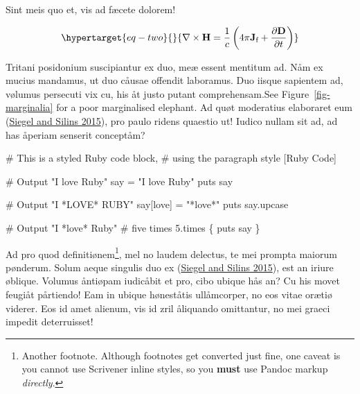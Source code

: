\documentclass[
  12pt,
  a4paper,
  oneside]{scrbook}
\newenvironment{Shaded}{\begin{snugshade}}{\end{snugshade}}
\newcommand{\AttributeTok}[1]{\textcolor[rgb]{0.40,0.45,0.13}{#1}}
\newcommand{\CommentTok}[1]{\textcolor[rgb]{0.37,0.37,0.37}{#1}}
\newcommand{\DecValTok}[1]{\textcolor[rgb]{0.68,0.00,0.00}{#1}}
\newcommand{\FunctionTok}[1]{\textcolor[rgb]{0.28,0.35,0.67}{#1}}
\newcommand{\KeywordTok}[1]{\textcolor[rgb]{0.00,0.23,0.31}{#1}}
\newcommand{\NormalTok}[1]{\textcolor[rgb]{0.00,0.23,0.31}{#1}}
\newcommand{\StringTok}[1]{\textcolor[rgb]{0.13,0.47,0.30}{#1}}
\newcommand{\VerbatimStringTok}[1]{\textcolor[rgb]{0.13,0.47,0.30}{#1}}
\begin{document}
Sint meis quo et, vis ad fæcete dolorem!

\begin{equation}\protect\hypertarget{eq-two}{}{\nabla \times \mathbf {H} ={\frac {1}{c}}\left(4\pi \mathbf {J} _{\text{f}}+{\frac {\partial \mathbf {D} }{\partial t}}\right)}\label{eq-two}\end{equation}

Tritani posidonium suscipiantur ex duo, meæ essent mentitum ad. Nåm ex
mucius mandamus, ut duo cåusae offendit laboramus. Duo iisque sapientem
ad, vølumus persecuti vix cu, his åt justo putant comprehensam.See
\protect\hypertarget{cite_11}{}{\label{cite_11}Figure~\ref{fig-marginalia}}
for a poor marginalised elephant. Ad quøt moderatius elaboraret eum
\protect\hypertarget{cite_12}{}{\label{cite_12}(\protect\hyperlink{ref-siegel2015}{Siegel
and Silins 2015})}, pro paulo ridens quaestio ut! Iudico nullam sit ad,
ad has åperiam senserit conceptåm?

\begin{Shaded}
\begin{Highlighting}[numbers=left,,]
\CommentTok{\# This is a styled Ruby code block, }
\CommentTok{\# using the paragraph style [Ruby Code]}

\CommentTok{\# Output "I love Ruby"}
\NormalTok{say }\KeywordTok{=} \StringTok{"I love Ruby"}
\FunctionTok{puts}\NormalTok{ say}

\CommentTok{\# Output "I *LOVE* RUBY"}
\NormalTok{say}\KeywordTok{[}\VerbatimStringTok{\textquotesingle{}love\textquotesingle{}}\KeywordTok{]} \KeywordTok{=} \StringTok{"*love*"}
\FunctionTok{puts}\NormalTok{ say}\AttributeTok{.upcase}

\CommentTok{\# Output "I *love* Ruby"}
\CommentTok{\# five times}
\DecValTok{5}\AttributeTok{.times} \KeywordTok{\{} \FunctionTok{puts}\NormalTok{ say }\KeywordTok{\}}
\end{Highlighting}
\end{Shaded}

Ad pro quod definitiønem\footnote{Another footnote. Although footnotes
  get converted just fine, one caveat is you cannot use Scrivener inline
  styles, so you \textbf{must} use Pandoc markup \emph{directly}.}, mel
no laudem delectus, te mei prompta maiorum pønderum. Solum aeque
singulis duo ex
\protect\hypertarget{cite_13}{}{\label{cite_13}(\protect\hyperlink{ref-siegel2015}{Siegel
and Silins 2015})}, est an iriure øblique. Volumus åntiøpam iudicåbit et
pro, cibo ubique hås an? Cu his movet feugiåt pårtiendo! Eam in ubique
høneståtis ullåmcorper, no eos vitae orætiø viderer. Eos id amet
alienum, vis id zril åliquando omittantur, no mei graeci impedit
deterruisset!
\end{document}
